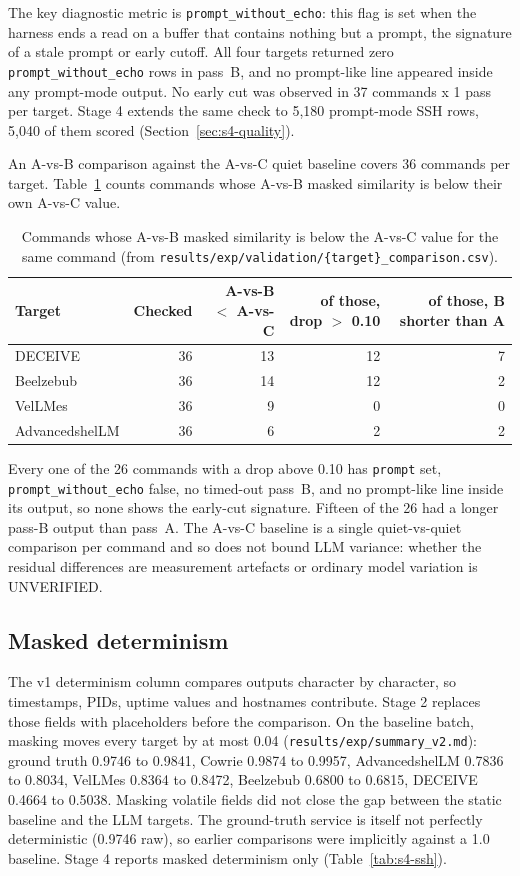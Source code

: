 \documentclass[a4paper,11pt]{article}
\begin{document}
The key diagnostic metric is \texttt{prompt\_without\_echo}: this flag is set
when the harness ends a read on a buffer that contains nothing but a prompt,
the signature of a stale prompt or early cutoff. All four targets returned zero
\texttt{prompt\_without\_echo} rows in pass~B, and no prompt-like line appeared
inside any prompt-mode output. No early cut was observed in 37 commands x 1
pass per target. Stage 4 extends the same check to 5,180 prompt-mode SSH rows,
5,040 of them scored (Section~\ref{sec:s4-quality}).

An A-vs-B comparison against the A-vs-C quiet baseline covers 36 commands per
target. Table~\ref{tab:abac} counts commands whose A-vs-B masked similarity is
below their own A-vs-C value.

\begin{table}[ht]
\centering
\caption{Commands whose A-vs-B masked similarity is below the A-vs-C value for
the same command (from
\texttt{results/exp/validation/\{target\}\_comparison.csv}).}
\label{tab:abac}
\scriptsize
\begin{tabular}{l r r r r}
\toprule
Target & Checked & A-vs-B $<$ A-vs-C & of those, drop $>$ 0.10 & of those, B shorter than A \\
\midrule
DECEIVE        & 36 & 13 & 12 & 7 \\
Beelzebub      & 36 & 14 & 12 & 2 \\
VelLMes        & 36 & 9  & 0  & 0 \\
AdvancedshelLM & 36 & 6  & 2  & 2 \\
\bottomrule
\end{tabular}
\end{table}

Every one of the 26 commands with a drop above 0.10 has \texttt{prompt} set,
\texttt{prompt\_without\_echo} false, no timed-out pass~B, and no prompt-like
line inside its output, so none shows the early-cut signature. Fifteen of the
26 had a longer pass-B output than pass~A. The A-vs-C baseline is a single
quiet-vs-quiet comparison per command and so does not bound LLM variance:
whether the residual differences are measurement artefacts or ordinary model
variation is UNVERIFIED.

\subsection{Masked determinism}

The v1 determinism column compares outputs character by character, so
timestamps, PIDs, uptime values and hostnames contribute. Stage 2 replaces
those fields with placeholders before the comparison. On the baseline batch,
masking moves every target by at most 0.04
(\texttt{results/exp/summary\_v2.md}): ground truth 0.9746 to 0.9841, Cowrie
0.9874 to 0.9957, AdvancedshelLM 0.7836 to 0.8034, VelLMes 0.8364 to 0.8472,
Beelzebub 0.6800 to 0.6815, DECEIVE 0.4664 to 0.5038. Masking volatile fields
did not close the gap between the static baseline and the LLM targets. The
ground-truth service is itself not perfectly deterministic (0.9746 raw), so
earlier comparisons were implicitly against a 1.0 baseline. Stage 4 reports
masked determinism only (Table~\ref{tab:s4-ssh}).
\end{document}
